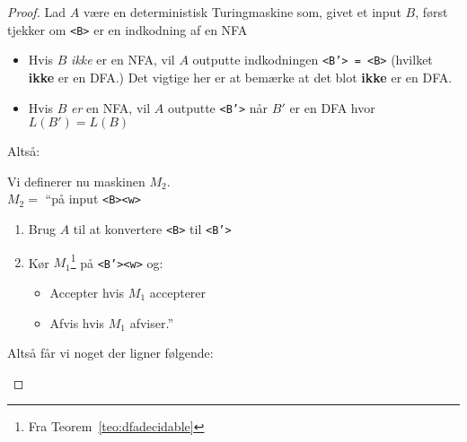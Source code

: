 \begin{proof}
	Lad $A$ være en deterministisk Turingmaskine som, givet et input $B$, først tjekker om \texttt{<B>} er en indkodning af en NFA
	\begin{itemize}
		\item Hvis $B$ \textit{ikke} er en NFA, vil $A$ outputte indkodningen \texttt{<B'> = <B>} (hvilket \textbf{ikke} er en DFA.) Det vigtige her er at bemærke at det blot \textbf{ikke} er en DFA.
		\item Hvis $B$ \textit{er} en NFA, vil $A$ outputte \texttt{<B'>} når $B'$ er en DFA hvor $L(B') = L(B)$
	\end{itemize}
	Altså:
	\begin{center}
	\end{center}

	Vi definerer nu maskinen $M_{2}$.\\
	\noindent
	$M_{2} = $ ``på input \texttt{<B><w>}
	\begin{enumerate}
		\item Brug $A$ til at konvertere \texttt{<B>} til \texttt{<B'>}
		\item Kør $M_{1}$\footnote{Fra Teorem~\ref{teo:dfadecidable}} på \texttt{<B'><w>} og:
		      \begin{itemize}
			      \item Accepter hvis $M_{1}$ accepterer
			      \item Afvis hvis $M_{1}$ afviser.''
		      \end{itemize}
	\end{enumerate}

	Altså får vi noget der ligner følgende:
	\begin{center}


\end{center}
\end{proof}
